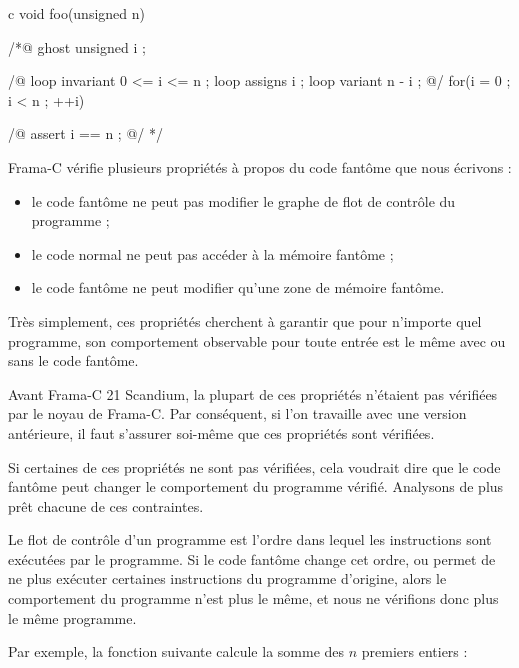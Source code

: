 \begin{CodeBlock}{c}
void foo(unsigned n){
 /*@ ghost
   unsigned i ;

   /@
     loop invariant 0 <= i <= n ;
     loop assigns i ;
     loop variant n - i ;
   @/
   for(i = 0 ; i < n ; ++i){

   }
   /@ assert i == n ; @/
 */
}
\end{CodeBlock}




Frama-C vérifie plusieurs propriétés à propos du code fantôme que nous écrivons :
\begin{itemize}
\item le code fantôme ne peut pas modifier le graphe de flot de contrôle
      du programme ;
\item le code normal ne peut pas accéder à la mémoire fantôme ;
\item le code fantôme ne peut modifier qu'une zone de mémoire fantôme.
\end{itemize}


Très simplement, ces propriétés cherchent à garantir que pour n'importe
quel programme, son comportement observable pour toute entrée est le même
avec ou sans le code fantôme.


\begin{Warning}
  Avant Frama-C 21 Scandium, la plupart de ces propriétés n'étaient pas vérifiées
  par le noyau de Frama-C. Par conséquent, si l'on travaille avec une version
  antérieure, il faut s'assurer soi-même que ces propriétés sont vérifiées.
\end{Warning}


Si certaines de ces propriétés ne sont pas vérifiées, cela voudrait dire que le
code fantôme peut changer le comportement du programme vérifié. Analysons de plus
prêt chacune de ces contraintes.




Le flot de contrôle d'un programme est l'ordre dans lequel les instructions sont
exécutées par le programme. Si le code fantôme change cet ordre, ou permet de ne
plus exécuter certaines instructions du programme d'origine, alors le comportement
du programme n'est plus le même, et nous ne vérifions donc plus le même programme.


Par exemple, la fonction suivante calcule la somme des $n$ premiers entiers :




